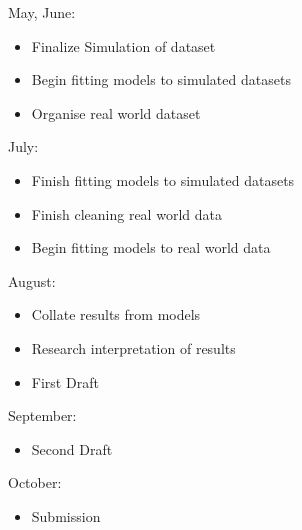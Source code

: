 \documentclass[a4paper]{article}
\begin{document}
May, June:
\begin{itemize}
	\item Finalize Simulation of dataset
	\item Begin fitting models to simulated datasets
	\item Organise real world dataset
\end{itemize}

July:
\begin{itemize}
	\item Finish fitting models to simulated datasets
	\item Finish cleaning real world data
	\item Begin fitting models to real world data
\end{itemize}

August:
\begin{itemize}
	\item Collate results from models
	\item Research interpretation of results
	\item First Draft
\end{itemize}

September:
\begin{itemize}
	\item Second Draft
\end{itemize}

October:
\begin{itemize}
	\item Submission
\end{itemize}
\end{document}
